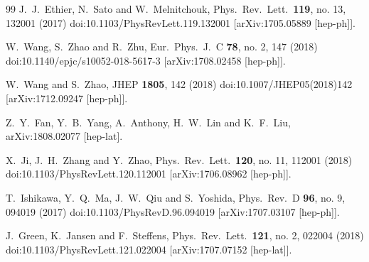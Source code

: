 \begin{thebibliography}{99}
  J.~J.~Ethier, N.~Sato and W.~Melnitchouk,
  Phys.\ Rev.\ Lett.\  {\bf 119}, no. 13, 132001 (2017)
  doi:10.1103/PhysRevLett.119.132001
  [arXiv:1705.05889 [hep-ph]].


  W.~Wang, S.~Zhao and R.~Zhu,
  Eur.\ Phys.\ J.\ C {\bf 78}, no. 2, 147 (2018)
  doi:10.1140/epjc/s10052-018-5617-3
  [arXiv:1708.02458 [hep-ph]].


  W.~Wang and S.~Zhao,
  JHEP {\bf 1805}, 142 (2018)
  doi:10.1007/JHEP05(2018)142
  [arXiv:1712.09247 [hep-ph]].


  Z.~Y.~Fan, Y.~B.~Yang, A.~Anthony, H.~W.~Lin and K.~F.~Liu,
  arXiv:1808.02077 [hep-lat].

  X.~Ji, J.~H.~Zhang and Y.~Zhao,
  Phys.\ Rev.\ Lett.\  {\bf 120}, no. 11, 112001 (2018)
  doi:10.1103/PhysRevLett.120.112001
  [arXiv:1706.08962 [hep-ph]].


  T.~Ishikawa, Y.~Q.~Ma, J.~W.~Qiu and S.~Yoshida,
  Phys.\ Rev.\ D {\bf 96}, no. 9, 094019 (2017)
  doi:10.1103/PhysRevD.96.094019
  [arXiv:1707.03107 [hep-ph]].

  J.~Green, K.~Jansen and F.~Steffens,
  Phys.\ Rev.\ Lett.\  {\bf 121}, no. 2, 022004 (2018)
  doi:10.1103/PhysRevLett.121.022004
  [arXiv:1707.07152 [hep-lat]].



\end{thebibliography}
